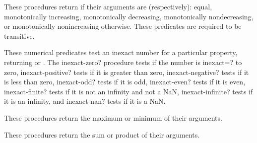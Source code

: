 \begin{entry}{%
}

These procedures return \schtrue{} if their arguments are
(respectively): equal, monotonically increasing, monotonically
decreasing, monotonically nondecreasing, or monotonically
nonincreasing \schfalse{} otherwise.  These predicates are required to
be transitive.
\end{entry}

\begin{entry}{%
}

These numerical predicates test an inexact number for a particular
property, returning \schtrue{} or \schfalse{}.  The {\cf
  inexact-zero?} procedure
tests if the number is {\cf inexact=?} to zero, {\cf
  inexact-positive?} tests if it is greater than zero, {\cf
  inexact-negative?} tests if it is less than zero, {\cf inexact-odd?}
tests if it is odd, {\cf inexact-even?} tests if it is even, {\cf
  inexact-finite?} tests if it is not an infinity and not a NaN, {\cf
  inexact-infinite?} tests if it is an infinity, and
  {\cf inexact-nan?} tests if it is a NaN.
\end{entry}

\begin{entry}{%
}

These procedures return the maximum or minimum of their arguments.
\end{entry}

\begin{entry}{%
}

These procedures return the sum or product of their arguments.
\end{entry}

